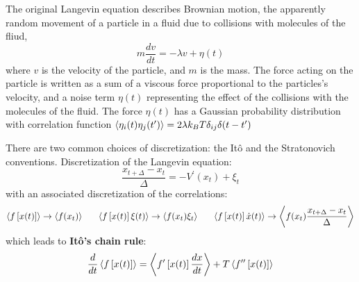 \documentclass[books,12pt]{elegantpaper}
\begin{document}
The original Langevin equation describes Brownian motion, the apparently random movement of a particle in a fluid due to collisions with molecules of the fliud, 
$$ m \frac{dv}{dt} = - \lambda v + \eta(t) $$
where $v$ is the velocity of the particle, and $m$ is the mass. The force acting on the particle is written as a sum of a viscous force proportional to the particles's velocity, and a noise term $\eta(t)$ representing the effect of the collisions with the molecules of the fluid. The force $\eta(t)$ has a Gaussian probability distribution with correlation function $ \left\langle \eta_i(t) \eta_j(t^\prime) \right\rangle = 2 \lambda k_B T \delta_{ij} \delta(t-t^\prime)$

There are two common choices of discretization: the Itô and the Stratonovich conventions. Discretization of the Langevin equation:
$$ \frac{x_{t+\Delta} - x_t}{\Delta} = -V^\prime(x_t) + \xi_t $$
with an associated discretization of the correlations:
$$ \left\langle f\left[x(t)\right] \right\rangle \to \left\langle f(x_t) \right\rangle \ \ \ \ \  \left\langle f\left[x(t)\right] \xi(t) \right\rangle \to \left\langle f(x_t)\xi_t \right\rangle \ \ \ \ \  \left\langle f\left[x(t)\right] \dot{x}(t) \right\rangle \to \left\langle f(x_t) \frac{x_{t+\Delta} - x_t}{\Delta} \right\rangle $$
which leads to \textbf{Itô's chain rule}:
$$ \frac{d}{dt} \left\langle f\left[x(t)\right] \right\rangle = \left\langle f^\prime\left[x(t)\right] \frac{dx}{dt} \right\rangle + T \left\langle f^{\prime\prime} \left[ x(t) \right] \right\rangle $$
\end{document}
